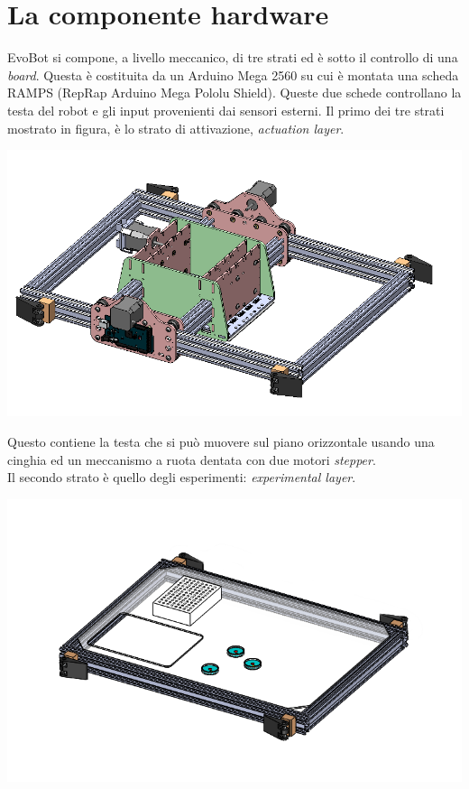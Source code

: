 \section{La componente hardware}
\label{sec:456}
EvoBot si compone, a livello meccanico, di tre strati ed è sotto il controllo di una \emph{board}. Questa è costituita da un Arduino Mega 2560 su cui è montata una scheda RAMPS (RepRap Arduino Mega Pololu Shield). Queste due schede controllano la testa del robot e gli input provenienti dai sensori esterni. 
Il primo dei tre strati mostrato in figura, è lo strato di attivazione, \emph{actuation layer}. 
	\begin{center}
	  \includegraphics[scale=0.40]{actuation_layer.png}
	\end{center}
Questo contiene la testa che si può muovere sul piano orizzontale usando una cinghia ed un meccanismo a ruota dentata con due motori \emph{stepper}.
\\Il secondo strato è quello degli esperimenti: \emph{experimental layer}.
	\begin{center}
	  \includegraphics[scale=0.60]{experiment_layer.png}
	\end{center} 
